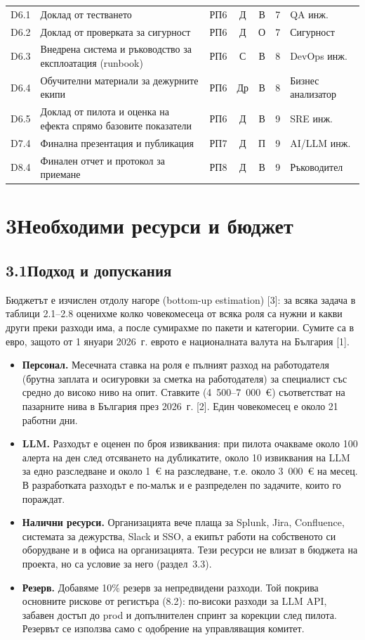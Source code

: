 \documentclass[11pt,a4paper]{article}
\begin{document}
{\begin{xltabular}{\textwidth}{@{}l X l c c c l@{}}
D6.1 & Доклад от тестването & РП6 & Д & В & 7 & QA инж.\\
D6.2 & Доклад от проверката за сигурност & РП6 & Д & О & 7 & Сигурност\\
D6.3 & Внедрена система и ръководство за експлоатация (runbook) & РП6 & С & В & 8 & DevOps инж.\\
D6.4 & Обучителни материали за дежурните екипи & РП6 & Др & В & 8 & Бизнес анализатор\\
D6.5 & Доклад от пилота и оценка на ефекта спрямо базовите показатели & РП6 & Д & В & 9 & SRE инж.\\
D7.4 & Финална презентация и публикация & РП7 & Д & П & 9 & AI/LLM инж.\\
D8.4 & Финален отчет и протокол за приемане & РП8 & Д & В & 9 & Ръководител\\
\end{xltabular}}

\section*{3\quad Необходими ресурси и бюджет}
\subsection*{3.1\quad Подход и допускания}
Бюджетът е изчислен отдолу нагоре (bottom-up estimation) [3]: за всяка задача в таблици 2.1--2.8 оценихме колко човекомесеца от всяка роля са нужни и какви други преки разходи има, а после сумирахме по пакети и категории. Сумите са в евро, защото от 1 януари 2026~г. еврото е националната валута на България [1].
\begin{itemize}
\item \textbf{Персонал.} Месечната ставка на роля е пълният разход на работодателя (брутна заплата и осигуровки за сметка на работодателя) за специалист със средно до високо ниво на опит. Ставките (4~500--7~000~\euro{}) съответстват на пазарните нива в България през 2026~г. [2]. Един човекомесец е около 21 работни дни.
\item \textbf{LLM.} Разходът е оценен по броя извиквания: при пилота очакваме около 100 алерта на ден след отсяването на дубликатите, около 10 извиквания на LLM за едно разследване и около 1~\euro{} на разследване, т.е. около 3~000~\euro{} на месец. В разработката разходът е по-малък и е разпределен по задачите, които го пораждат.
\item \textbf{Налични ресурси.} Организацията вече плаща за Splunk, Jira, Confluence, системата за дежурства, Slack и SSO, а екипът работи на собственото си оборудване и в офиса на организацията. Тези ресурси не влизат в бюджета на проекта, но са условие за него (раздел~3.3).
\item \textbf{Резерв.} Добавяме 10\% резерв за непредвидени разходи. Той покрива основните рискове от регистъра (8.2): по-високи разходи за LLM API, забавен достъп до prod и допълнителен спринт за корекции след пилота. Резервът се използва само с одобрение на управляващия комитет.
\end{itemize}
\end{document}
